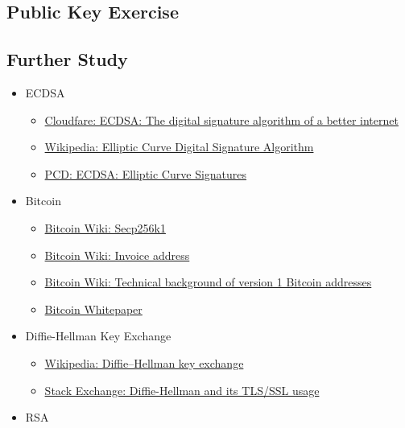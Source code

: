 \documentclass[a4paper, oneside]{book}
\begin{document}
\subsection{Public Key Exercise}

\subsection{Further Study}

\begin{itemize}
	\item ECDSA
	\begin{itemize}
		\item \href{https://blog.cloudflare.com/ecdsa-the-digital-signature-algorithm-of-a-better-internet/}{Cloudfare: ECDSA: The digital signature algorithm of a better internet}
		\item \href{https://en.wikipedia.org/wiki/Elliptic_Curve_Digital_Signature_Algorithm}{Wikipedia: Elliptic Curve Digital Signature Algorithm}
		\item \href{https://cryptobook.nakov.com/digital-signatures/ecdsa-sign-verify-messages}{PCD: ECDSA: Elliptic Curve Signatures}
	\end{itemize}
	\item Bitcoin
	\begin{itemize}
		\item \href{https://en.bitcoin.it/wiki/Secp256k1}{Bitcoin Wiki: Secp256k1}
		\item \href{https://en.bitcoin.it/wiki/Invoice_address}{Bitcoin Wiki: Invoice address}
		\item \href{https://en.bitcoin.it/wiki/Technical_background_of_version_1_Bitcoin_addresses}{Bitcoin Wiki: Technical background of version 1 Bitcoin addresses}
		\item \href {https://bitcoin.org/bitcoin.pdf}{Bitcoin Whitepaper}
	\end{itemize}
	\item Diffie-Hellman Key Exchange
	\begin{itemize}
		\item \href{https://en.wikipedia.org/wiki/Diffie%E2%80%93Hellman_key_exchange}{Wikipedia: Diffie–Hellman key exchange}
		\item \href{https://security.stackexchange.com/questions/41205/diffie-hellman-and-its-tls-ssl-usage/41226#41226}{Stack Exchange: Diffie-Hellman and its TLS/SSL usage}
	\end{itemize}
	\item RSA
	\begin{itemize}

\end{itemize}
\end{itemize}
\end{document}
